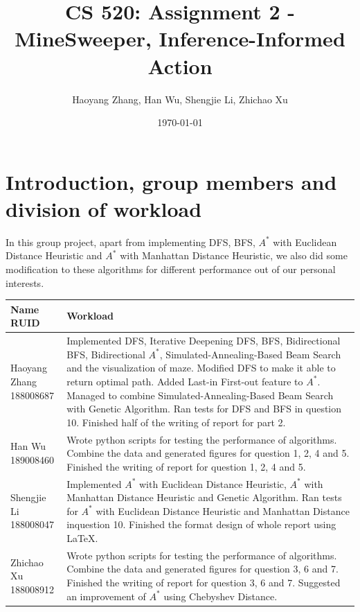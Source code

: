 \documentclass[letter]{article}
\title{CS 520: Assignment 2 - MineSweeper, Inference-Informed Action}
\author{Haoyang Zhang, Han Wu, Shengjie Li, Zhichao Xu}
\date{\today}
\begin{document}
\maketitle

\section{Introduction, group members and division of workload}
\label{sec:Introduction}

In this group project, apart from implementing DFS, BFS, $ A^* $ with Euclidean Distance Heuristic and $ A^* $ with Manhattan Distance Heuristic, we also did some modification to these algorithms for different performance out of our personal interests.  \\
\begin{tabular}{| p{2.5cm} | p{\textwidth -3.5cm} |}
	\hline
	\makecell[c]{Name \\ RUID} & Workload \\
	\hline
	\makecell[c]{Haoyang Zhang \\ 188008687} & {Implemented DFS, Iterative Deepening DFS, BFS, Bidirectional BFS, Bidirectional $ A^* $, Simulated-Annealing-Based Beam Search and the visualization of maze. Modified DFS to make it able to return optimal path. Added Last-in First-out feature to $ A^* $. Managed to combine Simulated-Annealing-Based Beam Search with Genetic Algorithm. Ran tests for DFS and BFS in question 10. Finished half of the writing of report for part 2.} \\
	\hline
	\makecell[c]{Han Wu \\ 189008460} & {Wrote python scripts for testing the performance of algorithms. Combine the data and generated figures for question 1, 2, 4 and 5. Finished the writing of report for question 1, 2, 4 and 5.} \\
	\hline
	\makecell[c]{Shengjie Li \\ 188008047} & {Implemented $ A^* $ with Euclidean Distance Heuristic, $ A^* $ with Manhattan Distance Heuristic and Genetic Algorithm. Ran tests for $ A^* $ with Euclidean Distance Heuristic and Manhattan Distance inquestion 10. Finished the format design of whole report using \LaTeX. } \\
	\hline
	\makecell[c]{Zhichao Xu \\ 188008912} & {Wrote python scripts for testing the performance of algorithms. Combine the data and generated figures for question 3, 6 and 7. Finished the writing of report for question 3, 6 and 7. Suggested an improvement of $ A^* $ using Chebyshev Distance.} \\
	\hline
\end{tabular}
\end{document}
